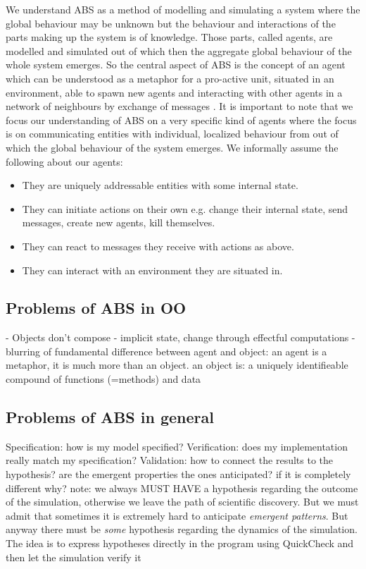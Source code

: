 We understand ABS as a method of modelling and simulating a system where the global behaviour may be unknown but the behaviour and interactions of the parts making up the system is of knowledge. Those parts, called agents, are modelled and simulated out of which then the aggregate global behaviour of the whole system emerges. So the central aspect of ABS is the concept of an agent which can be understood as a metaphor for a pro-active unit, situated in an environment, able to spawn new agents and interacting with other agents in a network of neighbours by exchange of messages \cite{wooldridge_introduction_2009}. It is important to note that we focus our understanding of ABS on a very specific kind of agents where the focus is on communicating entities with individual, localized behaviour from out of which the global behaviour of the system emerges. We informally assume the following about our agents:

\begin{itemize}
	\item They are uniquely addressable entities with some internal state.
	\item They can initiate actions on their own e.g. change their internal state, send messages, create new agents, kill themselves.
	\item They can react to messages they receive with actions as above.
	\item They can interact with an environment they are situated in.
\end{itemize} 

\subsection{Problems of ABS in OO}
- Objects don't compose
- implicit state, change through effectful computations
- blurring of fundamental difference between agent and object: an agent is a metaphor, it is much more than an object. an object is: a uniquely identifieable compound of functions (=methods) and data

\subsection{Problems of ABS in general}
Specification: how is my model specified? 
Verification: does my implementation really match my specification? 
Validation: how to connect the results to the hypothesis? are the emergent properties the ones anticipated? if it is completely different why? note: we always MUST HAVE a hypothesis regarding the outcome of the simulation, otherwise we leave the path of scientific discovery. But we must admit that sometimes it is extremely hard to anticipate \textit{emergent patterns}. But anyway there must be \textit{some} hypothesis regarding the dynamics of the simulation.
The idea is to express hypotheses directly in the program using QuickCheck and then let the simulation verify it


